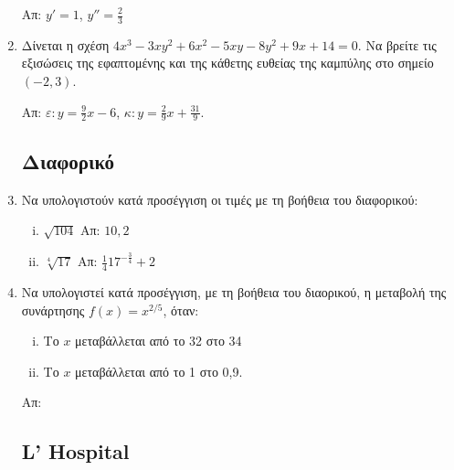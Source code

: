 \begin{enumerate}
      \hfill Απ: $ y' = 1$, $ y'' = \frac{2}{3} $

    \item Δίνεται η σχέση $ 4x^{3} - 3xy^{2} + 6x^{2} - 5xy - 8 y^{2} + 9x + 14
      = 0$. Να βρείτε τις εξισώσεις της εφαπτομένης και της κάθετης ευθείας
      της καμπύλης στο σημείο $ (-2,3) $.

      \hfill Απ: $\varepsilon\colon y = \frac{9}{2} x - 6 $, 
      $\kappa\colon y = \frac{2}{9} x + \frac{31}{9} $.


      \subsection*{Διαφορικό}

    \item Να υπολογιστούν κατά προσέγγιση οι τιμές με τη βοήθεια του διαφορικού:
      \begin{enumerate}[i)]
        \item $\sqrt{104}$ \hfill Απ: $10,2$
        \item $\sqrt[4]{17}$ \hfill Απ: $\frac{1}{4}17^{-\frac{3}{4}}+2$
      \end{enumerate}

    \item Να υπολογιστεί κατά προσέγγιση, με τη βοήθεια του διαορικού, η μεταβολή 
      της συνάρτησης $ f(x) = x^{2/5} $, όταν:
      \begin{enumerate}[i)]
        \item Το $x$ μεταβάλλεται από το 32 στο 34 
        \item Το $x$ μεταβάλλεται από το 1 στο 0,9.
      \end{enumerate}

      \hfill Απ: 


      \subsection*{L' Hospital}


\end{enumerate}
